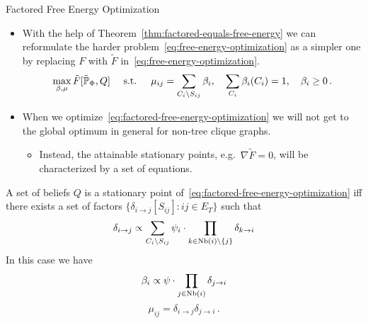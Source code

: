 \begin{frame}{Factored Free Energy Optimization}
\begin{itemize}
    \item With the help of Theorem~\ref{thm:factored-equals-free-energy} we can reformulate the harder problem~\eqref{eq:free-energy-optimization} as a simpler one by replacing $F$ with $\tilde{F}$ in~\eqref{eq:free-energy-optimization}.
\begin{equation}
    \label{eq:factored-free-energy-optimization}
    \max_{\beta,\mu} \tilde{F}[\tilde{\Pb}_{\Phi}, Q] \quad\text{ s.t. }\quad \mu_{ij} = \sum_{C_i \backslash S_{ij}} \beta_i,\quad \sum_{C_i} \beta_i(C_i) = 1,\quad \beta_i \geq 0\,.
\end{equation}
\pause
    \item When we optimize~\eqref{eq:factored-free-energy-optimization} we will not get to the global optimum in general for non-tree clique graphs.
     \begin{itemize}
        \pause \item Instead, the attainable stationary points, e.g.\ $\nabla \tilde{F} = 0$, will be characterized by a set of equations.
    \end{itemize}
 \end{itemize}
 \pause
 \begin{theorem}
    \label{thm:stationary-points-factored-free-energy}
 A set of beliefs $Q$ is a stationary point of~\eqref{eq:factored-free-energy-optimization} iff there exists a set of factors $\{\delta_{i \rightarrow j}[S_{ij}] : ij \in E_T\}$ such that
 \begin{equation}
    \delta_{i \rightarrow j} \propto \sum_{C_i \backslash S_{ij}} \psi_i \cdot \prod_{k \in \text{Nb}(i) \backslash \{j\}} \delta_{k \rightarrow i}
 \end{equation}
 \pause
 In this case we have 
 \begin{equation}
 \beta_i \propto \psi \cdot \prod_{j \in \text{Nb}(i)} \delta_{j \rightarrow i}
 \end{equation}
 \pause
 \begin{equation}
 \mu_{ij} = \delta_{i \rightarrow j} \delta_{j \rightarrow i}\,.
 \end{equation}
 \end{theorem}
\end{frame}

